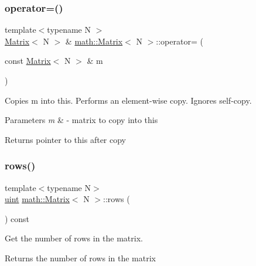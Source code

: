 \subsubsection{\texorpdfstring{operator=()}{operator=()}}
{\footnotesize\ttfamily template$<$typename N $>$ \\
\hyperlink{classmath_1_1Matrix}{Matrix}$<$ N $>$ \& \hyperlink{classmath_1_1Matrix}{math\+::\+Matrix}$<$ N $>$\+::operator= (\begin{DoxyParamCaption}\item[{const \hyperlink{classmath_1_1Matrix}{Matrix}$<$ N $>$ \&}]{m }\end{DoxyParamCaption})}

Copies {\ttfamily m} into {\ttfamily this}. Performs an element-\/wise copy. Ignores self-\/copy. 
\begin{DoxyParams}{Parameters}
{\em m} & -\/ matrix to copy into {\ttfamily this} \\
\hline
\end{DoxyParams}
\begin{DoxyReturn}{Returns}
pointer to {\ttfamily this} after copy 
\end{DoxyReturn}
\mbox{\label{classmath_1_1Matrix_a602173645d806afe305ed77b1ff38273}} 
\subsubsection{\texorpdfstring{rows()}{rows()}}
{\footnotesize\ttfamily template$<$typename N$>$ \\
\hyperlink{typedefs_8h_a7b9b9413622e67b9df7f2d090b48682b}{uint} \hyperlink{classmath_1_1Matrix}{math\+::\+Matrix}$<$ N $>$\+::rows (\begin{DoxyParamCaption}{ }\end{DoxyParamCaption}) const\hspace{0.3cm}{\ttfamily [inline]}}

Get the number of rows in the matrix. \begin{DoxyReturn}{Returns}
the number of rows in the matrix 
\end{DoxyReturn}
\mbox{\label{classmath_1_1Matrix_afbf9ebd6114faec44e9eccb553ca8f33}} 
